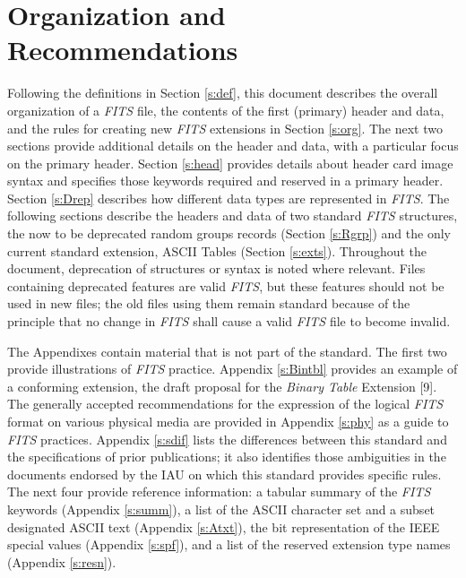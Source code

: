   \section{Organization and Recommendations}
  
   Following the definitions in Section \ref{s:def}, this document describes
   the overall organization of a {\em FITS\/} file, the contents of 
   the first (primary) header and data, and the rules for
   creating new {\em FITS\/} extensions 
   in Section \ref{s:org}. 
   The next two sections provide additional details on the header and 
   data, with a particular focus on the 
   primary header.  
   Section \ref{s:head} provides details about header card image 
   syntax and specifies those keywords required
   and reserved in a 
   primary header.  Section \ref{s:Drep} describes how different
   data types are represented in {\em FITS}. The following sections
   describe the headers and data of two standard {\em FITS\/}
   structures, the now to be
   deprecated 
   random groups records (Section \ref{s:Rgrp}) 
   and the only current standard extension, 
   ASCII Tables (Section \ref{s:exts}).  Throughout the document, 
   deprecation of structures or syntax is noted where relevant.  
   Files containing deprecated features are valid {\em FITS}, 
   but these features should not be used in new files;
   the old files using them remain standard because of the 
   principle that no change in {\em FITS\/} shall cause 
   a valid {\em FITS\/} file to become invalid.

   The Appendixes contain material that is not part of the standard.  
   The first two provide illustrations of {\em FITS\/} practice. Appendix
   \ref{s:Bintbl} provides an example of a conforming 
   extension, the 
   draft proposal for the 
   {\em  Binary Table\/} Extension [9].
   The generally accepted recommendations 
   for the expression of the logical {\em FITS\/} format on various 
   physical media are provided in Appendix \ref{s:phy} as a guide to 
   {\em FITS\/} practices.  Appendix \ref{s:sdif} lists 
   the differences between this standard and the specifications of 
   prior publications; it also identifies those ambiguities in the
   documents endorsed by the IAU  on which
   this standard provides specific rules.
   The next four provide reference information: a tabular 
   summary of the {\em FITS\/} keywords 
   (Appendix \ref{s:summ}), a list 
   of the ASCII character set
   and a subset designated ASCII text 
   (Appendix \ref{s:Atxt}), the bit representation of the 
   IEEE special values 
   (Appendix \ref{s:spf}), and a list of the reserved 
   extension type names (Appendix \ref{s:resn}).

